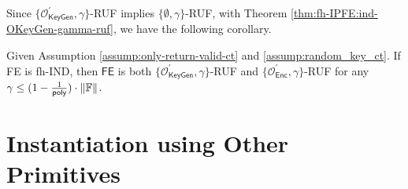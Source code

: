 Since $\{ \mathcal{O}^\prime_{\textsf{KeyGen}}, \gamma \}$-RUF implies $\{ \emptyset, \gamma \}$-RUF, with Theorem \ref{thm:fh-IPFE:ind-OKeyGen-gamma-ruf}, we have the following corollary.

\begin{corollary}
\label{cor:fh-IPFE:ind-OKeyGen-OEnc-ruf}
Given Assumption \ref{assump:only-return-valid-ct} and \ref{assump:random_key_ct}. If \textsf{FE} is fh-IND, then $\textsf{FE}$ is both $\{ \mathcal{O}^\prime_{\textsf{KeyGen}}, \gamma \}$-RUF and $\{ \mathcal{O}^\prime_{\textsf{Enc}}, \gamma \}$-RUF for any $\gamma \leq (1 - \frac{1}{\mathsf{poly}}) \cdot \|\mathbb{F}\|$.
\end{corollary}



\newpage


\section{Instantiation using Other Primitives}

